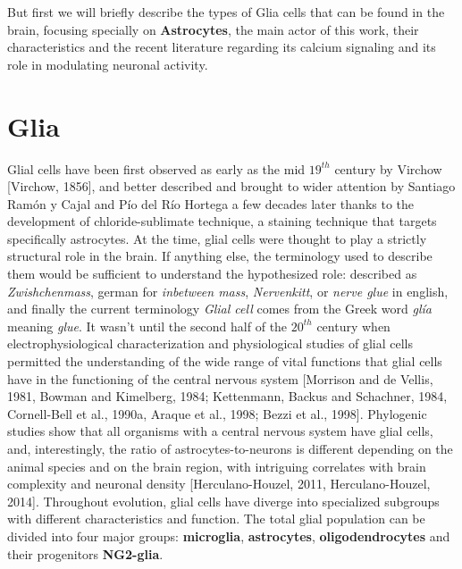 But first we will briefly describe the types of Glia cells that can be found in the brain, focusing specially on \textbf{Astrocytes}, the main actor of this work,  their characteristics and the recent literature regarding its calcium signaling and its role in modulating neuronal activity. 
\section{Glia}
\label{chap1:sec2:glia}
Glial cells have been first observed as early as the mid $19^{th}$ century by Virchow [Virchow, 1856], and better described and brought to wider attention by Santiago Ramón y Cajal and Pío del Río Hortega a few decades later thanks to the development of chloride-sublimate technique, a staining technique that targets specifically astrocytes.
At the time, glial cells were thought to play a strictly structural role in the brain.
If anything else, the terminology used to describe them would be sufficient to understand the hypothesized role: described as \textit{Zwishchenmass}, german for \textit{inbetween mass}, \textit{Nervenkitt}, or \textit{nerve glue} in english, and finally the current terminology \textit{Glial cell} comes from the Greek word \textit{gl\'ia} meaning \textit{glue}.
It wasn't until the second half of the $20^{th}$ century when electrophysiological characterization and physiological studies of glial cells permitted the understanding of the wide range of vital functions that glial cells have in the functioning of the central nervous system [Morrison and de Vellis, 1981, Bowman and Kimelberg, 1984; Kettenmann, Backus and Schachner, 1984, Cornell-Bell et al., 1990a, Araque et al., 1998; Bezzi et al., 1998]. 
Phylogenic studies show that all organisms with a central nervous system have glial cells, and, interestingly, the ratio of astrocytes-to-neurons is different depending on the animal species and on the brain region, with intriguing correlates with brain complexity and neuronal density [Herculano-Houzel, 2011, Herculano-Houzel, 2014].   
Throughout evolution, glial cells have diverge into specialized subgroups with different characteristics and function. 
The total glial population can be divided into four major groups: \textbf{microglia}, \textbf{astrocytes}, \textbf{oligodendrocytes} and their progenitors \textbf{NG2-glia}. 


